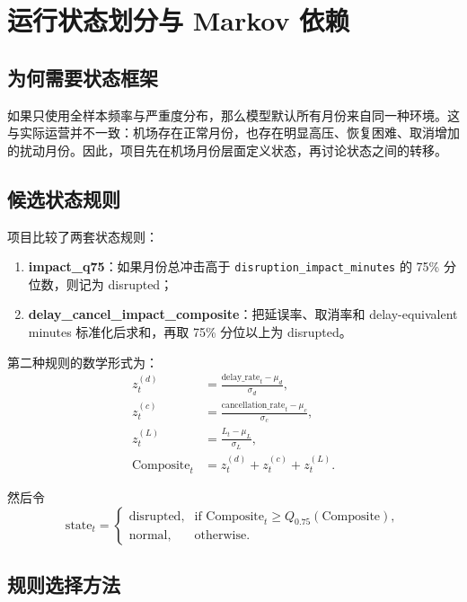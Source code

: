 \section{运行状态划分与 Markov 依赖}

\subsection{为何需要状态框架}

如果只使用全样本频率与严重度分布，那么模型默认所有月份来自同一种环境。这与实际运营并不一致：机场存在正常月份，也存在明显高压、恢复困难、取消增加的扰动月份。因此，项目先在机场月份层面定义状态，再讨论状态之间的转移。

\subsection{候选状态规则}

项目比较了两套状态规则：
\begin{enumerate}[leftmargin=2.2em]
  \item \textbf{impact\_q75}：如果月份总冲击高于 \texttt{disruption\_impact\_minutes} 的 75\% 分位数，则记为 disrupted；
  \item \textbf{delay\_cancel\_impact\_composite}：把延误率、取消率和 delay-equivalent minutes 标准化后求和，再取 75\% 分位以上为 disrupted。
\end{enumerate}

第二种规则的数学形式为：
\begin{align}
z_t^{(d)} &= \frac{\text{delay\_rate}_t - \mu_d}{\sigma_d}, \\
z_t^{(c)} &= \frac{\text{cancellation\_rate}_t - \mu_c}{\sigma_c}, \\
z_t^{(L)} &= \frac{L_t - \mu_L}{\sigma_L}, \\
\text{Composite}_t &= z_t^{(d)} + z_t^{(c)} + z_t^{(L)}.
\end{align}

然后令
\begin{equation}
\text{state}_t =
\begin{cases}
\text{disrupted}, & \text{if } \text{Composite}_t \ge Q_{0.75}(\text{Composite}), \\
\text{normal}, & \text{otherwise}.
\end{cases}
\end{equation}

\subsection{规则选择方法}

